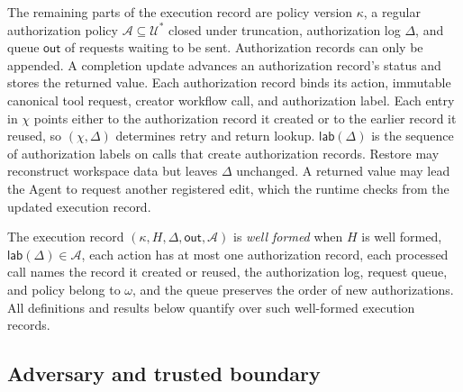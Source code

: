 The remaining parts of the execution record are policy version \(\kappa\), a regular authorization policy \(\mathcal A\subseteq\mathcal U^*\) closed under truncation, authorization log \(\Delta\), and queue \(\mathsf{out}\) of requests waiting to be sent.
Authorization records can only be appended.
A completion update advances an authorization record's status and stores the returned value.
Each authorization record binds its action, immutable canonical tool request, creator workflow call, and authorization label.
Each entry in \(\chi\) points either to the authorization record it created or to the earlier record it reused, so \((\chi,\Delta)\) determines retry and return lookup.
\(\mathsf{lab}(\Delta)\) is the sequence of authorization labels on calls that create authorization records.
Restore may reconstruct workspace data but leaves \(\Delta\) unchanged.
A returned value may lead the Agent to request another registered edit, which the runtime checks from the updated execution record.

The execution record \((\kappa,H,\Delta,\mathsf{out},\mathcal A)\) is \emph{well formed} when \(H\) is well formed, \(\mathsf{lab}(\Delta)\in\mathcal A\), each action has at most one authorization record, each processed call names the record it created or reused, the authorization log, request queue, and policy belong to \(\omega\), and the queue preserves the order of new authorizations.
All definitions and results below quantify over such well-formed execution records.

\subsection{Adversary and trusted boundary}

